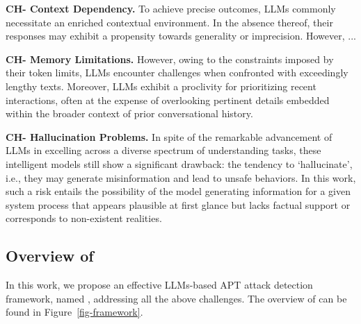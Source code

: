 \noindent
{\bf CH- Context Dependency.} %
To achieve precise outcomes, LLMs commonly necessitate an enriched contextual environment. In the absence thereof, their responses may exhibit a propensity towards generality or imprecision. However, ... 

\noindent
{\bf CH- Memory Limitations.} %
 However, owing to the constraints imposed by their token limits, LLMs encounter challenges when confronted with exceedingly lengthy texts. Moreover, LLMs exhibit a proclivity for prioritizing recent interactions, often at the expense of overlooking pertinent details embedded within the broader context of prior conversational history.

\noindent
{\bf CH- Hallucination Problems.} %
In spite of the remarkable advancement of LLMs in excelling across a diverse spectrum of understanding tasks, these intelligent models still show a significant drawback: the tendency to `hallucinate', i.e., they may generate misinformation and lead to unsafe behaviors.
In this work, such a risk entails the possibility of the model generating information for a given system process that appears plausible at first glance but lacks factual support or corresponds to non-existent realities.


\subsection{Overview of \tool}
In this work, we propose an effective LLMs-based APT attack detection framework, named \tool, addressing all the above challenges. The overview of \tool can be found in Figure~\ref{fig-framework}. 

